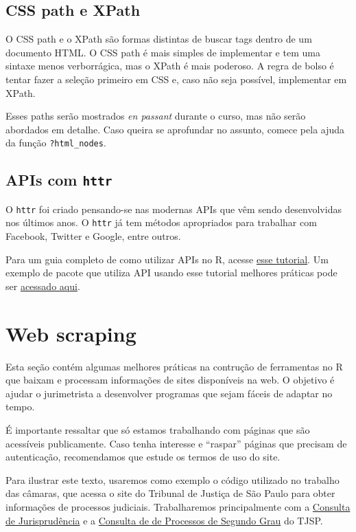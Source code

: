 \documentclass[]{book}
\begin{document}
\subsection{CSS path e XPath}\label{css-path-e-xpath}

O CSS path e o XPath são formas distintas de buscar tags dentro de um
documento HTML. O CSS path é mais simples de implementar e tem uma
sintaxe menos verborrágica, mas o XPath é mais poderoso. A regra de
bolso é tentar fazer a seleção primeiro em CSS e, caso não seja
possível, implementar em XPath.

Esses paths serão mostrados \emph{en passant} durante o curso, mas não
serão abordados em detalhe. Caso queira se aprofundar no assunto, comece
pela ajuda da função \texttt{?html\_nodes}.

\subsection{\texorpdfstring{APIs com
\texttt{httr}}{APIs com httr}}\label{apis-com-httr}

O \texttt{httr} foi criado pensando-se nas modernas APIs que vêm sendo
desenvolvidas nos últimos anos. O \texttt{httr} já tem métodos
apropriados para trabalhar com Facebook, Twitter e Google, entre outros.

Para um guia completo de como utilizar APIs no R, acesse
\href{https://cran.r-project.org/web/packages/httr/vignettes/api-packages.html}{esse
tutorial}. Um exemplo de pacote que utiliza API usando esse tutorial
melhores práticas pode ser
\href{https://github.com/jtrecenti/sptrans}{acessado aqui}.

\section{Web scraping}\label{web-scraping}

Esta seção contém algumas melhores práticas na contrução de ferramentas
no R que baixam e processam informações de sites disponíveis na web. O
objetivo é ajudar o jurimetrista a desenvolver programas que sejam
fáceis de adaptar no tempo.

É importante ressaltar que só estamos trabalhando com páginas que são
acessíveis publicamente. Caso tenha interesse e ``raspar'' páginas que
precisam de autenticação, recomendamos que estude os termos de uso do
site.

Para ilustrar este texto, usaremos como exemplo o código utilizado no
trabalho das câmaras, que acessa o site do Tribunal de Justiça de São
Paulo para obter informações de processos judiciais. Trabalharemos
principalmente com a
\href{https://esaj.tjsp.jus.br/cjsg/consultaCompleta.do}{Consulta de
Jurisprudência} e a
\href{https://esaj.tjsp.jus.br/cpo/sg/open.do}{Consulta de de Processos
de Segundo Grau} do TJSP.
\end{document}
